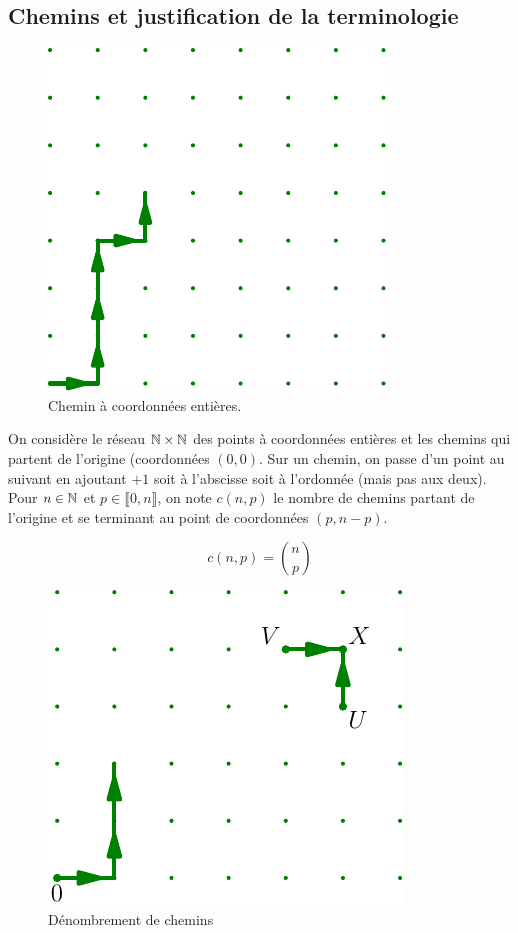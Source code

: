 \subsection{Chemins et justification de la terminologie}
\begin{figure}[h!]
  \centering
  \includegraphics{C2003_4.pdf}
  \caption{Chemin à coordonnées entières.}
  \label{fig:c2003_4}
\end{figure}
On considère le réseau $\mathbb{N}\times \mathbb{N}$ des points à coordonnées entières et les chemins qui partent de l'origine (coordonnées $(0,0)$. Sur un chemin, on passe d'un point au suivant en ajoutant $+1$ soit à l'abscisse soit à l'ordonnée (mais pas aux deux).\newline
Pour $n\in \mathbb{N}$ et $p\in \llbracket 0, n \rrbracket$, on note $c(n,p)$ le nombre de chemins partant de l'origine et se terminant au point de coordonnées $(p,n-p)$.
\begin{prop}
  \begin{displaymath}
    c(n,p) = \binom{n}{p}
  \end{displaymath}
\end{prop}
\begin{figure}[h!]
  \centering
  \includegraphics{C2003_5.pdf}
  \caption{Dénombrement de chemins}
  \label{fig:C2003_5}
\end{figure}


